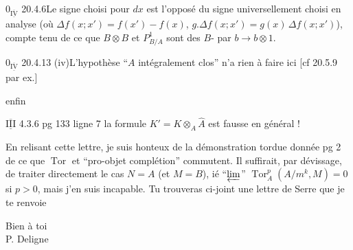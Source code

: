 $0_{\overline{\underline{\mathrm{IV}}}}$ 20.4.6\qquad Le signe choisi pour $dx$ est l'opposé du signe universellement choisi en analyse (où $\Delta f(x;x')=f(x')-f(x)$, $g.\Delta f(x;x')=g(x)\,\Delta f(x;x')$), compte tenu de ce que $B\otimes B$ et $P^1_{B/A}$ sont des $B$- par $b\longrightarrow b\otimes1$.


$0_{\overline{\underline{\mathrm{IV}}}}$ 20.4.13 (iv)\qquad L'hypothèse ``$A$ intégralement clos'' n'a rien à faire ici [cf 20.5.9 par ex.]

\margin{!}

enfin

$\overline{\underline{\mathrm{III}}}$ 4.3.6 pg 133 ligne 7 \quad la formule $K'=K\otimes_A\widehat A$ est fausse en général !

\margin{!!!}

En relisant cette lettre, je suis honteux de la démonstration tordue donnée pg 2 de ce que $\operatorname{Tor}$ et ``pro-objet complétion'' commutent. Il suffirait, par dévissage, de traiter directement le cas $N=A$ (et $M=B$), ié ``$\varprojlim$'' $\operatorname{Tor}^p_A(A/m^k,M)=0$ si $p>0$, mais j'en suis incapable. Tu trouveras ci-joint une lettre de Serre que je te renvoie

Bien à toi\\
P. Deligne\\
